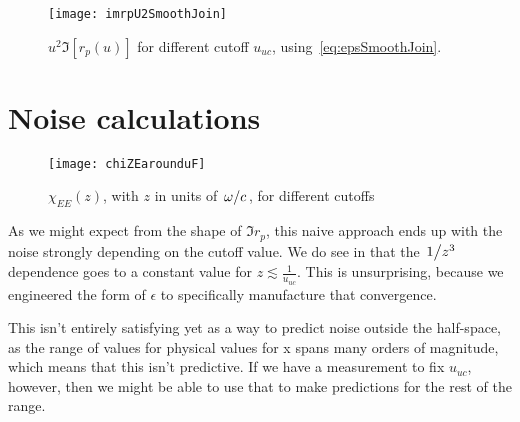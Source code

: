 \documentclass[../main.tex]{subfiles}
\begin{document}
	\begin{figure}[htp]
		\centering
		\texttt{[image: imrpU2SmoothJoin]}
		\caption{$u^2 \Im[r_p(u)]$ for different cutoff $u_{uc}$, using~\eqref{eq:epsSmoothJoin}.} \label{fig:u2imrpVsCutoffSmoothJoin}
	\end{figure}

	\section{Noise calculations} \label{sec:noise}

	\begin{figure}[htp]
		\centering
		\texttt{[image: chiZEarounduF]}
		\caption{$\chi_{EE}(z)$, with $z$ in units of $\flatfrac{\omega}{c}$, for different cutoffs} \label{fig:chiZEarounduF}
	\end{figure}

	As we might expect from the shape of $\Im r_p$, this naive approach ends up with the noise strongly depending on the cutoff value.
	We do see in  that the $\flatfrac{1}{z^3}$ dependence goes to a constant value for $z \lesssim \frac{1}{u_{uc}}$.
	This is unsurprising, because we engineered the form of $\epsilon$ to specifically manufacture that convergence.

	This isn't entirely satisfying yet as a way to predict noise outside the half-space, as the range of values for physical values for x spans many orders of magnitude, which means that this isn't predictive.
	If we have a measurement to fix $u_{uc}$, however, then we might be able to use that to make predictions for the rest of the range.

\end{document}
